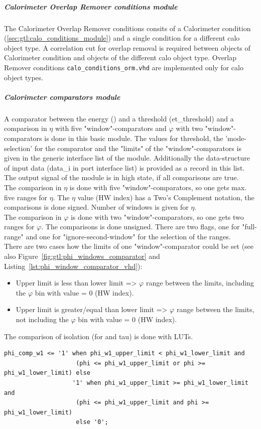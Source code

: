 
\subparagraph{Calorimeter Overlap Remover conditions module}\label{sec:gtl:calo_conditions_orm_module}
The Calorimeter Overlap Remover conditions consits of a Calorimeter condition (\ref{sec:gtl:calo_conditions_module}) and a single condition for a different calo object type. A correlation cut for overlap removal is required between objects of Calorimeter condition and objects of the different calo object type.
Overlap Remover conditions \texttt{calo\_conditions\_orm.vhd} are implemented only for calo object types.

\subparagraph{Calorimeter comparators module}\label{sec:gtl:calo_comp_module}
A comparator between the energy (\et) and a threshold (et\_threshold) and a comparison in $\eta$ with five "window"-comparators and $\varphi$ with two "window"-comparators
is done in this basic module. The values for \et threshold, the 'mode-selection' for the \et comparator and the "limits" of the "window"-comparators 
is given in the generic interface list of the module. Additionally the data-structure of input data (data\_i in port interface list) is provided
as a record in this list. The output signal of the module is in high state, if all comparisons are true.\\
The comparison in $\eta$ is done with five "window"-comparators, so one gets max. five ranges for $\eta$. The $\eta$ value (HW index) has a Two's Complement notation, the comparisons is done signed. Number of windows is given for $\eta$.\\
The comparison in $\varphi$ is done with two "window"-comparators, so one gets two ranges for $\varphi$. The comparisons is done unsigned. There are two flags, one for "full-range" and one for "ignore-second-window" for the selection of the ranges.\\
There are two cases how the limits of one "window"-comparator could be set (see also Figure~\ref{fig:gtl:phi_windows_comparator} and Listing~\ref{lst:phi_window_comparator_vhd}):
\begin{itemize}
\item Upper limit is less than lower limit => $\varphi$ range between the limits, including the $\varphi$ bin with value = 0 (HW index).
\item Upper limit is greater/equal than lower limit => $\varphi$ range between the limits, not including the $\varphi$ bin with value = 0 (HW index).
\end{itemize}
The comparison of isolation (for \egamma and tau) is done with LUTs.
\begin{lstlisting}[label=lst:phi_window_comparator_vhd,float=here,caption=VHDL code of "window"-comparator in $\varphi$,captionpos=t]
    phi_comp_w1 <= '1' when phi_w1_upper_limit < phi_w1_lower_limit and
                    (phi <= phi_w1_upper_limit or phi >= phi_w1_lower_limit) else
                   '1' when phi_w1_upper_limit >= phi_w1_lower_limit and
                    (phi <= phi_w1_upper_limit and phi >= phi_w1_lower_limit)
                    else '0';
\end{lstlisting}

